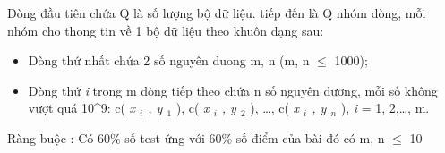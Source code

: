 Dòng đầu tiên chứa Q là số lượng bộ dữ liệu. tiếp đến là Q nhóm dòng, mỗi nhóm cho thong tin về 1 bộ dữ liệu theo khuôn dạng sau:
\begin{itemize}
	\item Dòng thứ nhất chứa 2 số nguyên duong m, n (m, n  $\le$  1000);
	\item Dòng thứ \emph{ i } trong m dòng tiếp theo chứa n số nguyên dương, mỗi số không vượt quá 10^9: c( \emph{ x $_ i $ , y $_ 1 $} ), c( \emph{ x $_ i $ , y $_ 2 $} ), …, c( \emph{ x $_ i $ , y $_ n $} ), \emph{ i } = 1, 2,…, m.
\end{itemize}

Ràng buộc : Có 60\% số test ứng với 60\% số điểm của bài đó có m, n  $\le$  10

\